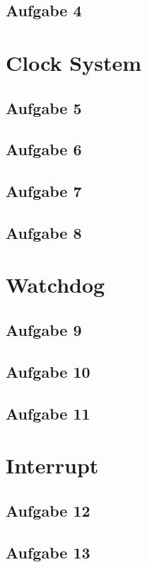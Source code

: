\documentclass[11pt,a4paper,onecolumn]{report}
\begin{document}
\section{Aufgabe 4}
%

\chapter{Clock System}

\section{Aufgabe 5}
\section{Aufgabe 6}
\section{Aufgabe 7}
\section{Aufgabe 8}

\chapter{Watchdog}

\section{Aufgabe 9}
\section{Aufgabe 10}
\section{Aufgabe 11}

\chapter{Interrupt}

\section{Aufgabe 12}
\section{Aufgabe 13}
\end{document}
